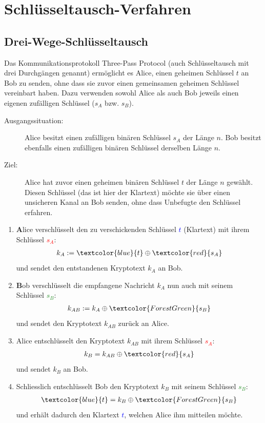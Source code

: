 \chapter{Schlüsseltausch-Verfahren}\label{ch:schluesseltausch}
\section{Drei-Wege-Schlüsseltausch}
\begin{myprocedure}\label{myprocedure:Komm}
	Das Kommunikationsprotokoll Three-Pass Protocol (auch Schlüsseltausch mit drei Durchgängen genannt) ermöglicht es Alice, einen geheimen Schlüssel $t$ an Bob zu senden, ohne dass sie zuvor einen gemeinsamen geheimen Schlüssel vereinbart haben. Dazu verwenden sowohl Alice als auch Bob jeweils einen eigenen zufälligen Schlüssel ($s_A$ bzw. $s_B$).

	\begin{description}
		\item[Ausgangssituation:] Alice besitzt einen zufälligen binären Schlüssel $s_A$ der Länge $n$. Bob besitzt ebenfalls einen zufälligen binären Schlüssel derselben Länge $n$.
		\item[Ziel:] Alice hat zuvor einen geheimen binären Schlüssel $t$ der Länge $n$ gewählt. Diesen Schlüssel (das ist hier der Klartext) möchte sie über einen unsicheren Kanal an Bob senden, ohne dass Unbefugte den Schlüssel erfahren.
	\end{description}
	\begin{enumerate}
		\item \textbf{A}lice verschlüsselt den zu verschickenden Schlüssel \textcolor{blue}{$t$} (Klartext) mit ihrem Schlüssel \textcolor{red}{$s_A$}:
		      \begin{align*}
			      k_A := \textcolor{blue}{t} \oplus \textcolor{red}{s_A}
		      \end{align*}
		      und sendet den entstandenen Kryptotext $k_A$ an Bob.
		\item \textbf{B}ob verschlüsselt die empfangene Nachricht $k_A$ nun auch mit seinem Schlüssel \textcolor{ForestGreen}{$s_B$}:
		      \begin{align*}
			      k_{AB} := k_A \oplus \textcolor{ForestGreen}{s_B}
		      \end{align*}
		      und sendet den Kryptotext $k_{AB}$ zurück an Alice.
		\item Alice entschlüsselt den Kryptotext $k_{AB}$ mit ihrem Schlüssel \textcolor{red}{$s_A$}:
		      \begin{align*}
			      k_B = k_{AB} \oplus \textcolor{red}{s_A}
		      \end{align*}
		      und sendet $k_B$ an Bob.
		\item Schliesslich entschlüsselt Bob den Kryptotext $k_B$ mit seinem Schlüssel \textcolor{ForestGreen}{$s_B$}:
		      \begin{align*}
			      \textcolor{blue}{t} = k_B \oplus \textcolor{ForestGreen}{s_B}
		      \end{align*}
		      und erhält dadurch den Klartext \textcolor{blue}{$t$}, welchen Alice ihm mitteilen möchte.
	\end{enumerate}
\end{myprocedure}

